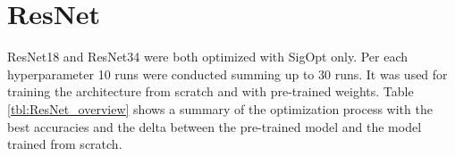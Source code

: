 \begin{figure}[H]
\label{fig:vgg13_heatmap}
\end{figure}
















\section{ResNet}

ResNet18 and ResNet34 were both optimized with SigOpt only. Per each hyperparameter 10 runs were conducted summing up to 30 runs. It was used for training the architecture from scratch and with pre-trained weights. Table \ref{tbl:ResNet_overview} shows a summary of the optimization process with the best accuracies and the delta between the pre-trained model and the model trained from scratch.

